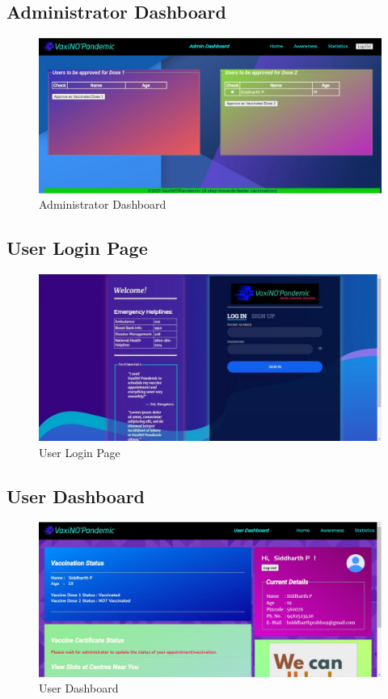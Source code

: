 \documentclass{article}
\begin{document}
    \subsection{Administrator Dashboard}
        \begin{figure}[hbt]
            \centering
            \includegraphics[scale=0.40682]{admindash.jpg}
            \caption{Administrator Dashboard}
            \label{fig:admindash}
        \end{figure}
    \subsection{User Login Page}
        \begin{figure}[hbt]
            \centering
            \includegraphics[scale=0.32]{userlogin.jpeg}
            \caption{User Login Page}
            \label{fig:userlogin}
        \end{figure}
    \newpage
    \subsection{User Dashboard}
        \begin{figure}[hbt]
            \centering
            \includegraphics[scale=0.406]{userdash.jpg}
            \caption{User Dashboard}
            \label{fig:userdashboard}
        \end{figure}
\end{document}
